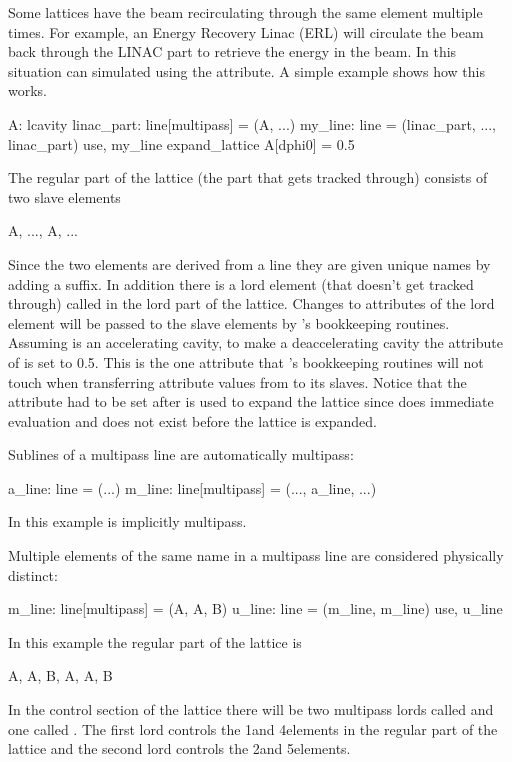 Some lattices have the beam recirculating through the same element
multiple times. For example, an Energy Recovery Linac (ERL) will
circulate the beam back through the LINAC part to retrieve the energy
in the beam. In \bmad this situation can simulated using the
 attribute. A simple example shows how this works.
\begin{example}
  A: lcavity
  linac_part: line[multipass] = (A, ...)
  my_line: line = (linac_part, ..., linac_part)
  use, my_line
  expand_lattice
  A[dphi0] = 0.5
\end{example}
The regular part of the lattice (the part that gets tracked through)
consists of two slave elements
\begin{example}
  A, ..., A, ...
\end{example}
Since the two elements are derived from a  line they are
given unique names by adding a  suffix. In addition there is
a lord element (that doesn't get tracked through) called  in the
lord part of the lattice. Changes to attributes of the lord 
element will be passed to the slave elements by \bmad's bookkeeping
routines. Assuming  is an accelerating cavity, to make
 a deaccelerating cavity the  attribute of
 is set to 0.5. This is the one attribute that \bmad's
bookkeeping routines will not touch when transferring attribute values
from  to its slaves. Notice that the  attribute had to
be set after  is used to expand the lattice since
\bmad does immediate evaluation and  does not exist before
the lattice is expanded.

Sublines of a multipass line are automatically multipass:
\begin{example}
  a_line: line = (...)
  m_line: line[multipass] = (..., a_line, ...)
\end{example}
In this example  is implicitly multipass.

Multiple elements of the same name in a multipass line are considered 
physically distinct:
\begin{example}
  m_line: line[multipass] = (A, A, B)
  u_line: line = (m_line, m_line)
  use, u_line
\end{example}
In this example the regular part of the lattice is
\begin{example}
  A, A, B, A, A, B
\end{example}
In the control section of the lattice there will be two multipass
lords called  and one called . The first  lord 
controls the 1\St and 4\Th elements in the regular part of the lattice 
and the second  lord controls the 2\Nd and 5\Th elements.

